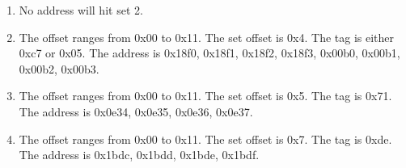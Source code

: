 \documentclass{article}
\begin{document}
\begin{enumerate}[label=\textbf{\Alph*.}]
	\item No address will hit set 2.
	\item
	The offset ranges from 0x00 to 0x11.
	The set offset is 0x4.
	The tag is either 0xc7 or 0x05.
	The address is 0x18f0, 0x18f1, 0x18f2, 0x18f3, 0x00b0, 0x00b1, 0x00b2, 0x00b3.
	\item
	The offset ranges from 0x00 to 0x11.
	The set offset is 0x5.
	The tag is 0x71.
	The address is 0x0e34, 0x0e35, 0x0e36, 0x0e37.
	\item
	The offset ranges from 0x00 to 0x11.
	The set offset is 0x7.
	The tag is 0xde.
	The address is 0x1bdc, 0x1bdd, 0x1bde, 0x1bdf.
\end{enumerate}
\end{document}
